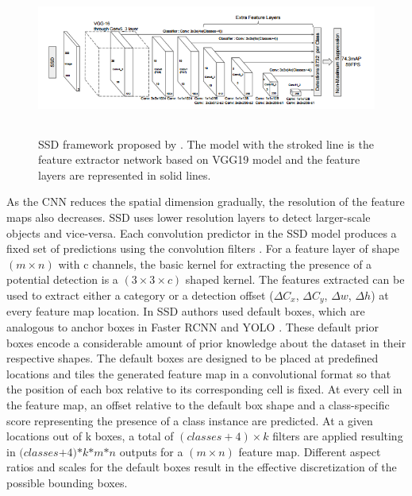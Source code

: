     \begin{figure}[!htbp]
        \centering
        \includegraphics[width=15cm, height=5cm]{images/frameworks/SSD.png}
        \caption[SSD framework]{SSD framework proposed by \citet[p. 24]{Liu2016SSDSS}. The model with the stroked line is the feature extractor network based on VGG19 model and the feature layers are represented in solid lines.}
        \label{fig:Fr-RCNN}
    \end{figure}
    
    As the CNN reduces the spatial dimension gradually, the resolution of the feature maps also decreases. SSD uses lower resolution layers to detect larger-scale objects and vice-versa. Each convolution predictor in the SSD model produces a fixed set of predictions using the convolution filters \label{feature_maps}. For a feature layer of shape $(m \times n)$ with c channels, the basic kernel for extracting the presence of a potential detection is a $(3 \times 3 \times c)$ shaped kernel. The features extracted can be used to extract either a category or a detection offset ($\Delta C_{x}$, $\Delta C_{y}$, $\Delta w$, $\Delta h$) at every feature map location. In SSD authors used default boxes, which are analogous to anchor boxes in Faster RCNN \cite{Girshick2015} and YOLO \cite{Ren2019}. These default prior boxes encode a considerable amount of prior knowledge about the dataset in their respective shapes. The default boxes are designed to be placed at predefined locations and tiles the generated feature map in a convolutional format so that the position of each box relative to its corresponding cell is fixed. At every cell in the feature map, an offset relative to the default box shape and a class-specific score representing the presence of a class instance are predicted. At a given locations out of k boxes, a total of $(classes+4) \times k$ filters are applied resulting in $\textit{(classes+4)*k*m*n}$ outputs for a $(m \times n)$ feature map. Different aspect ratios and scales for the default boxes result in the effective discretization of the possible bounding boxes.
    
